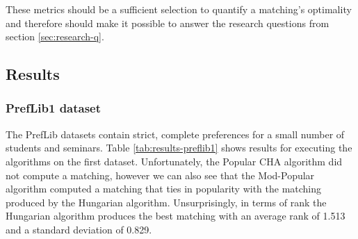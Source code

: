 These metrics should be a sufficient selection to quantify a matching's optimality and therefore should make it possible to answer the research questions from section \ref{sec:research-q}.

\subsection{Results}

\subsubsection{PrefLib1 dataset}
The PrefLib datasets contain strict, complete preferences for a small number of students and seminars. Table \ref{tab:results-preflib1} shows results for executing the algorithms on the first dataset. Unfortunately, the Popular CHA algorithm did not compute a matching, however we can also see that the Mod-Popular algorithm computed a matching that ties in popularity with the matching produced by the Hungarian algorithm. Unsurprisingly, in terms of rank the Hungarian algorithm produces the best matching with an average rank of 1.513 and a standard deviation of 0.829.

\begin{table}[h!]
  \centering
  \caption{Summary of the results for PrefLib1}
  \label{tab:results-preflib1}
\end{table}

